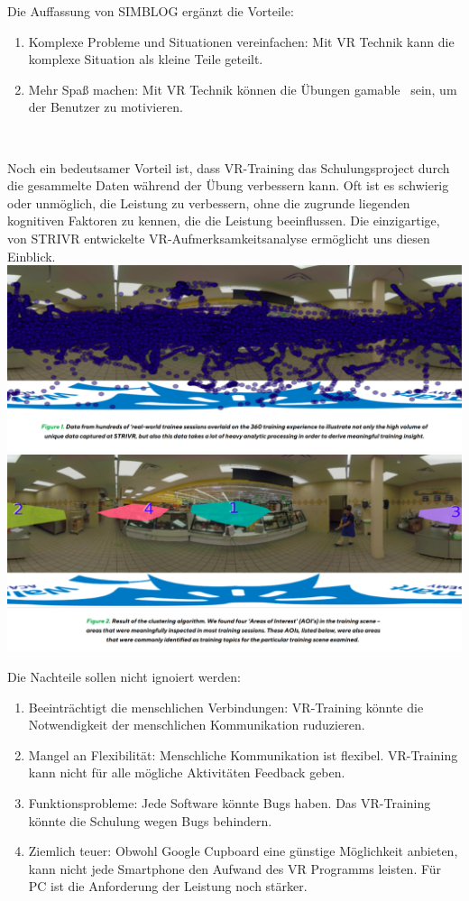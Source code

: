 Die Auffassung von SIMBLOG\citep{16} ergänzt die Vorteile:

\begin{enumerate}
\item Komplexe Probleme und Situationen vereinfachen: Mit VR Technik kann die komplexe Situation als kleine Teile geteilt.
\item Mehr Spaß machen: Mit VR Technik können die Übungen \glqq gamable \grqq\ sein, um der Benutzer zu motivieren. 
\end{enumerate}\

Noch ein bedeutsamer Vorteil ist, dass VR-Training das Schulungsproject durch die gesammelte Daten während der Übung verbessern kann. \glqq Oft ist es schwierig oder unmöglich, die Leistung zu verbessern, ohne die zugrunde liegenden kognitiven Faktoren zu kennen, die die Leistung beeinflussen. Die einzigartige, von STRIVR entwickelte VR-Aufmerksamkeitsanalyse ermöglicht uns diesen Einblick. \grqq\ \citep{18}
\includegraphics[width=\textwidth]{images/intentionanalys1.png}
\includegraphics[width=\textwidth]{images/intentionanalys2.png}

Die Nachteile sollen nicht ignoiert werden\citep{17}:

\begin{enumerate}
\item Beeinträchtigt die menschlichen Verbindungen: VR-Training könnte die Notwendigkeit der menschlichen Kommunikation ruduzieren.
\item Mangel an Flexibilität: Menschliche Kommunikation ist flexibel. VR-Training kann nicht für alle mögliche Aktivitäten Feedback geben.
\item Funktionsprobleme: Jede Software könnte Bugs haben. Das VR-Training könnte die Schulung wegen Bugs behindern.
\item Ziemlich teuer: Obwohl Google Cupboard eine günstige Möglichkeit anbieten, kann nicht jede Smartphone den Aufwand des VR Programms leisten. Für PC ist die Anforderung der Leistung noch stärker.
\end{enumerate}\

